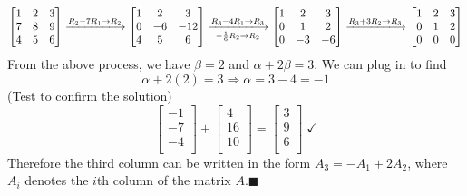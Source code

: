\documentclass{article}
\begin{document}
\[
  \begin{bmatrix}
    1 & 2 & 3  \\
    7 & 8 & 9  \\
    4 & 5 & 6  \\
  \end{bmatrix}\xlongrightarrow{R_2 -7R_1 \to R_2}\begin{bmatrix}
    1 & 2 & 3  \\
    0 & -6 & -12  \\
    4 & 5 & 6  \\
  \end{bmatrix}\xlongrightarrow[-\frac{1}{6}R_2 \to R_2]{R_3 -4R_1 \to R_3}\begin{bmatrix}
    1 &2  &3   \\
     0&1  &2   \\
     0&-3  &-6   \\
  \end{bmatrix}\xlongrightarrow{R_3 +3R_2 \to R_3}\begin{bmatrix}
    1 &2  &3   \\
     0&1  &2   \\
     0&0  &0   \\
  \end{bmatrix}
\]
From the above process, we have \(\beta =2\) and \(\alpha +2\beta =3\). We can plug in to find 
\[
  \alpha +2(2)=3\Longrightarrow \alpha =3-4=-1
\]
(Test to confirm the solution)
\[
  \begin{bmatrix}
     -1 \\
     -7 \\
      -4\\
  \end{bmatrix}+\begin{bmatrix}
     4 \\
     16 \\
      10\\
  \end{bmatrix}=\begin{bmatrix}
     3 \\
     9 \\
     6 \\
  \end{bmatrix}\;\checkmark
\]
Therefore the third column can be written in the form \(A_3 =-A_1 +2A_2\), where \(A_i\) denotes the \(i\)th column of the matrix \(A\).\hfill\(\blacksquare\)
\end{document}
